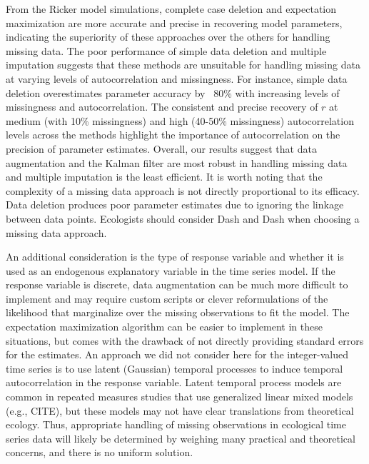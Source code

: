 \documentclass{article}
\begin{document}
From the Ricker model simulations, complete case deletion and expectation maximization are more accurate and precise in recovering model parameters, indicating the superiority of these approaches over the others for handling missing data. The poor performance of simple data deletion and multiple imputation suggests that these methods are unsuitable for handling missing data at varying levels of autocorrelation and missingness. For instance, simple data deletion overestimates parameter accuracy by ~80\% with increasing levels of missingness and autocorrelation. The consistent and precise recovery of $r$ at medium (with 10\% missingness) and high (40-50\% missingness) autocorrelation levels across the methods highlight the importance of autocorrelation on the precision of parameter estimates. Overall, our results suggest that data augmentation and the Kalman filter are most robust in handling missing data and multiple imputation is the least efficient. It is worth noting that the complexity of a missing data approach is not directly proportional to its efficacy. Data deletion produces poor parameter estimates due to ignoring the linkage between data points. Ecologists should consider Dash and Dash when choosing a missing data approach.




An additional consideration is the type of response variable and whether it is used as an endogenous explanatory variable in the time series model. If the response variable is discrete, data augmentation can be much more difficult to implement and may require custom scripts or clever reformulations of the likelihood that marginalize over the missing observations to fit the model. The expectation maximization algorithm can be easier to implement in these situations, but comes with the drawback of not directly providing standard errors for the estimates. An approach we did not consider here for the integer-valued time series is to use latent (Gaussian) temporal processes to induce temporal autocorrelation in the response variable. Latent temporal process models are common in repeated measures studies that use generalized linear mixed models (e.g., CITE), but these models may not have clear translations from theoretical ecology. Thus, appropriate handling of missing observations in ecological time series data will likely be determined by weighing many practical and theoretical concerns, and there is no uniform solution.
\end{document}
